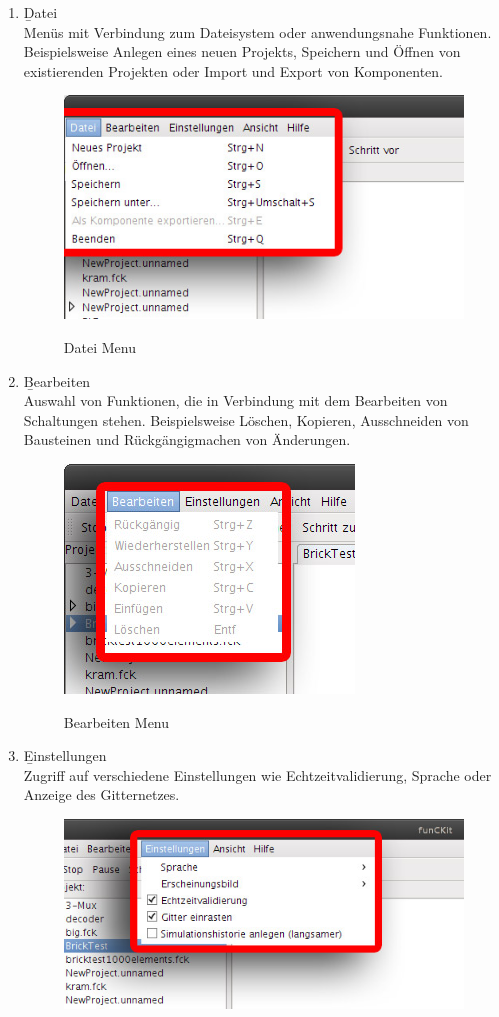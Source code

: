 \documentclass[12pt,a4paper]{scrartcl}
\newcommand{\fckLiveValidation}{Echtzeitvalidierung\xspace}
\begin{document}
\begin{enumerate}
	\item \b{Datei} \\
		Menüs mit Verbindung zum Dateisystem oder anwendungsnahe Funktionen. Beispielsweise Anlegen eines neuen Projekts, Speichern und Öffnen von existierenden Projekten oder Import und Export von Komponenten.
		\begin{figure}[H]
			\centering
			\includegraphics[width=0.6\linewidth]{images/datei.jpg}
			\label{fig:menu-file}
			\caption{Datei Menu}
		\end{figure}
	\item \b{Bearbeiten} \\
		Auswahl von Funktionen, die in Verbindung mit dem Bearbeiten von Schaltungen stehen. Beispielsweise Löschen, Kopieren, Ausschneiden von Bausteinen und Rückgängigmachen von Änderungen.
		\begin{figure}[H]
			\centering
			\includegraphics[width=0.5\linewidth]{images/bearbeiten.jpg}
			\label{fig:menu-edit}
			\caption{Bearbeiten Menu}
		\end{figure}
	\item \b{Einstellungen} \\
		Zugriff auf verschiedene Einstellungen wie \fckLiveValidation, Sprache oder Anzeige des Gitternetzes.
		\begin{figure}[H]
			\centering
			\includegraphics[width=0.6\linewidth]{images/einstellungen.jpg}

\end{figure}
\end{enumerate}
\end{document}
